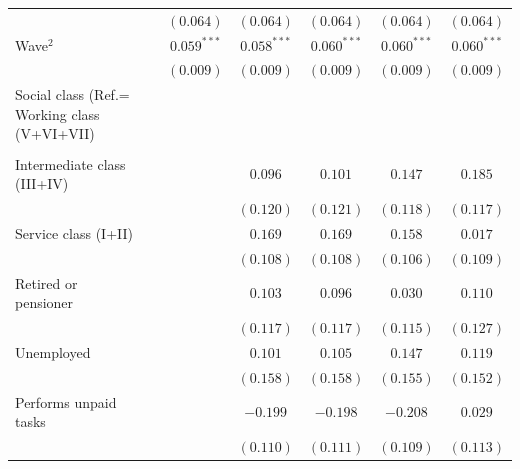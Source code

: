 \documentclass[
  12pt,
]{article}
\begin{document}
\begin{table}
{\begin{center}
{\begin{tabular}{l c c c c c c}
                                             &                & $(0.064)$     & $(0.064)$     & $(0.064)$     & $(0.064)$     & $(0.064)$     \\
Wave$^2$                                     &                & $0.059^{***}$ & $0.058^{***}$ & $0.060^{***}$ & $0.060^{***}$ & $0.060^{***}$ \\
                                             &                & $(0.009)$     & $(0.009)$     & $(0.009)$     & $(0.009)$     & $(0.009)$     \\
Social class (Ref.= Working class (V+VI+VII) &                &               &               &               &               &               \\
                                             &                &               &               &               &               &               \\
\quad Intermediate class (III+IV)            &                &               & $0.096$       & $0.101$       & $0.147$       & $0.185$       \\
                                             &                &               & $(0.120)$     & $(0.121)$     & $(0.118)$     & $(0.117)$     \\
\quad Service class (I+II)                   &                &               & $0.169$       & $0.169$       & $0.158$       & $0.017$       \\
                                             &                &               & $(0.108)$     & $(0.108)$     & $(0.106)$     & $(0.109)$     \\
\quad Retired or pensioner                   &                &               & $0.103$       & $0.096$       & $0.030$       & $0.110$       \\
                                             &                &               & $(0.117)$     & $(0.117)$     & $(0.115)$     & $(0.127)$     \\
\quad Unemployed                             &                &               & $0.101$       & $0.105$       & $0.147$       & $0.119$       \\
                                             &                &               & $(0.158)$     & $(0.158)$     & $(0.155)$     & $(0.152)$     \\
\quad Performs unpaid tasks                  &                &               & $-0.199$      & $-0.198$      & $-0.208$      & $0.029$       \\
                                             &                &               & $(0.110)$     & $(0.111)$     & $(0.109)$     & $(0.113)$     \\

\end{tabular}}
\end{center}}
\end{table}
\end{document}
